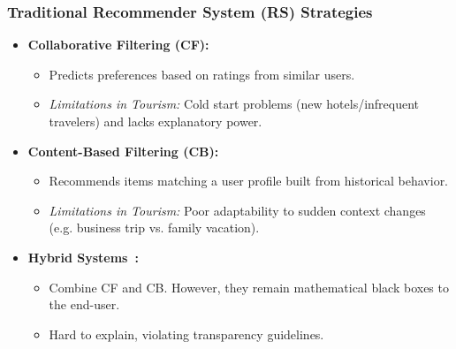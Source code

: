 \begin{frame}
    \frametitle{Traditional Recommender System (RS) Strategies}
    \begin{itemize}
        \item \textbf{Collaborative Filtering (CF):}
            \begin{itemize}
                \item Predicts preferences based on ratings from similar users.
                \item \textit{Limitations in Tourism:} Cold start problems (new hotels/infrequent travelers) and lacks explanatory power.
            \end{itemize}
        \item \textbf{Content-Based Filtering (CB):}
            \begin{itemize}
                \item Recommends items matching a user profile built from historical behavior.
                \item \textit{Limitations in Tourism:} Poor adaptability to sudden context changes (e.g. business trip vs. family vacation).
            \end{itemize}
        \item \textbf{Hybrid Systems~\cite{8308293, Sarkar2023}:}
            \begin{itemize}
                \item Combine CF and CB. However, they remain mathematical black boxes to the end-user.
                \item Hard to explain, violating transparency guidelines.
            \end{itemize}
    \end{itemize}
\end{frame}

